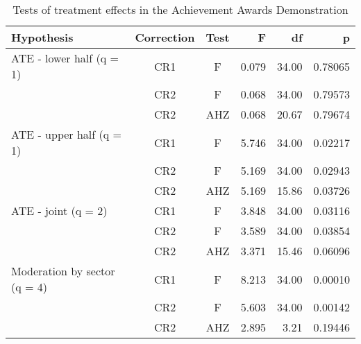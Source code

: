 \documentclass[12pt]{article}\usepackage[]{graphicx}\usepackage[]{color}
\begin{document}
\begin{table}[bth]
\centering
\begin{tabular}{lccrrr}
  \toprule
Hypothesis & Correction & Test & F & df & p \\ 
  \midrule
ATE - lower half (q = 1) & CR1 & F & 0.079 & 34.00 & 0.78065 \\ 
   & CR2 & F & 0.068 & 34.00 & 0.79573 \\ 
   & CR2 & AHZ & 0.068 & 20.67 & 0.79674 \\ 
   \midrule
ATE - upper half (q = 1) & CR1 & F & 5.746 & 34.00 & 0.02217 \\ 
   & CR2 & F & 5.169 & 34.00 & 0.02943 \\ 
   & CR2 & AHZ & 5.169 & 15.86 & 0.03726 \\ 
   \midrule
ATE - joint (q = 2) & CR1 & F & 3.848 & 34.00 & 0.03116 \\ 
   & CR2 & F & 3.589 & 34.00 & 0.03854 \\ 
   & CR2 & AHZ & 3.371 & 15.46 & 0.06096 \\ 
   \midrule
Moderation by sector (q = 4) & CR1 & F & 8.213 & 34.00 & 0.00010 \\ 
   & CR2 & F & 5.603 & 34.00 & 0.00142 \\ 
   & CR2 & AHZ & 2.895 & 3.21 & 0.19446 \\ 
   \bottomrule
\end{tabular}
\caption{Tests of treatment effects in the Achievement Awards Demonstration} 
\label{tab:AAD}
\end{table}
\end{document}
